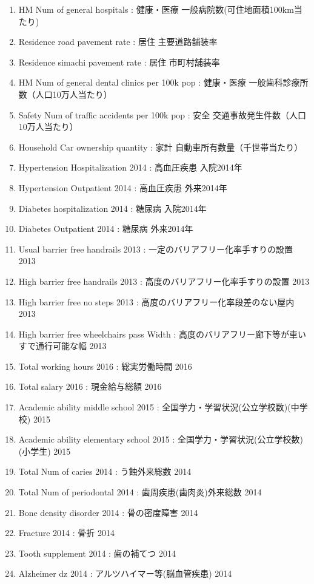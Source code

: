 \begin{enumerate}
  \item   HM Num of general hospitals  :   健康・医療 一般病院数(可住地面積100km当たり)
  \item   Residence road pavement rate  :   居住 主要道路舗装率
  \item   Residence simachi pavement rate  :   居住 市町村舗装率
  \item   HM Num of general dental clinics per 100k pop  :   健康・医療 一般歯科診療所数（人口10万人当たり）
  \item   Safety Num of traffic accidents per 100k pop  :   安全 交通事故発生件数（人口10万人当たり）
  \item   Household Car ownership quantity  :   家計 自動車所有数量（千世帯当たり）
  \item   Hypertension Hospitalization 2014  :   高血圧疾患 入院2014年
  \item   Hypertension Outpatient 2014  :   高血圧疾患 外来2014年
  \item   Diabetes hospitalization 2014  :   糖尿病 入院2014年
  \item   Diabetes Outpatient 2014  :   糖尿病 外来2014年
  \item   Usual barrier free handrails 2013  :   一定のバリアフリー化率手すりの設置 2013
  \item   High barrier free handrails 2013  :   高度のバリアフリー化率手すりの設置 2013
  \item   High barrier free no steps 2013  :   高度のバリアフリー化率段差のない屋内 2013
  \item   High barrier free wheelchairs pass Width  :   高度のバリアフリー廊下等が車いすで通行可能な幅 2013
  \item   Total working hours 2016  :   総実労働時間 2016
  \item   Total salary 2016  :   現金給与総額 2016
  \item   Academic ability middle school 2015  :   全国学力・学習状況(公立学校数)(中学校) 2015
  \item   Academic ability elementary school 2015  :   全国学力・学習状況(公立学校数)(小学生) 2015
  \item   Total Num of caries 2014  :   う蝕外来総数 2014
  \item   Total Num of periodontal 2014  :   歯周疾患(歯肉炎)外来総数 2014
  \item   Bone density disorder 2014  :   骨の密度障害 2014
  \item   Fracture 2014  :   骨折 2014
  \item   Tooth supplement 2014  :   歯の補てつ 2014
  \item   Alzheimer dz 2014  :   アルツハイマー等(脳血管疾患) 2014

\end{enumerate}

